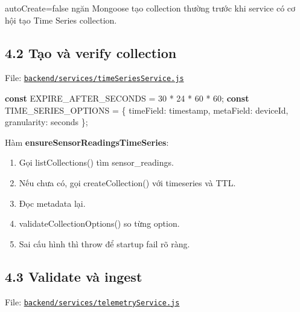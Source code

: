 \documentclass[11pt,oneside,openany]{book}
\renewcommand{\texttt}[1]{{\ttfamily\small #1}}
\newenvironment{Shaded}{\begin{snugshade}}{\end{snugshade}}
\newcommand{\DataTypeTok}[1]{\textcolor[rgb]{0.16,0.50,0.73}{#1}}
\newcommand{\DecValTok}[1]{\textcolor[rgb]{0.96,0.45,0.00}{#1}}
\newcommand{\KeywordTok}[1]{\textcolor[rgb]{0.81,0.81,0.76}{\textbf{#1}}}
\newcommand{\NormalTok}[1]{\textcolor[rgb]{0.81,0.81,0.76}{#1}}
\newcommand{\OperatorTok}[1]{\textcolor[rgb]{0.81,0.81,0.76}{#1}}
\newcommand{\StringTok}[1]{\textcolor[rgb]{0.96,0.31,0.31}{#1}}
\renewenvironment{Shaded}{%
  \def\FrameCommand{\fboxsep=8pt\colorbox{shadecolor}}%
  \MakeFramed{\advance\hsize-\width\FrameRestore}%
}{\endMakeFramed}
\providecommand{\tightlist}{\setlength{\itemsep}{1pt}\setlength{\parskip}{0pt}}
\begin{document}
\texttt{autoCreate=false} ngăn Mongoose tạo collection thường trước khi
service có cơ hội tạo Time Series collection.

\subsection{4.2 Tạo và verify
collection}\label{42-tux1ea1o-vuxe0-verify-collection}

File:
\href{../backend/services/timeSeriesService.js}{\nolinkurl{backend/services/timeSeriesService.js}}

\begin{Shaded}
\begin{Highlighting}[]
\KeywordTok{const}\NormalTok{ EXPIRE\_AFTER\_SECONDS }\OperatorTok{=} \DecValTok{30} \OperatorTok{*} \DecValTok{24} \OperatorTok{*} \DecValTok{60} \OperatorTok{*} \DecValTok{60}\OperatorTok{;}
\KeywordTok{const}\NormalTok{ TIME\_SERIES\_OPTIONS }\OperatorTok{=}\NormalTok{ \{}
  \DataTypeTok{timeField}\OperatorTok{:} \StringTok{\textquotesingle{}timestamp\textquotesingle{}}\OperatorTok{,}
  \DataTypeTok{metaField}\OperatorTok{:} \StringTok{\textquotesingle{}deviceId\textquotesingle{}}\OperatorTok{,}
  \DataTypeTok{granularity}\OperatorTok{:} \StringTok{\textquotesingle{}seconds\textquotesingle{}}
\NormalTok{\}}\OperatorTok{;}
\end{Highlighting}
\end{Shaded}

Hàm \textbf{ensureSensorReadingsTimeSeries}:

\begin{enumerate}
\def\labelenumi{\arabic{enumi}.}
\tightlist
\item
  Gọi \texttt{listCollections()} tìm \texttt{sensor\_readings}.
\item
  Nếu chưa có, gọi \texttt{createCollection()} với \texttt{timeseries}
  và TTL.
\item
  Đọc metadata lại.
\item
  \texttt{validateCollectionOptions()} so từng option.
\item
  Sai cấu hình thì throw để startup fail rõ ràng.
\end{enumerate}

\subsection{4.3 Validate và ingest}\label{43-validate-vuxe0-ingest}

File:
\href{../backend/services/telemetryService.js}{\nolinkurl{backend/services/telemetryService.js}}
\end{document}
